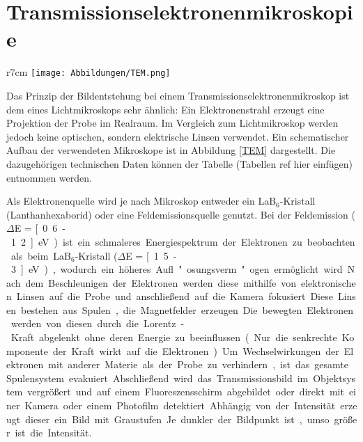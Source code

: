 \section{Transmissionselektronenmikroskopie} %
\label{sec:elektron_spektroskopie}

\begin{wrapfigure}{r}{7cm}
	\centering
	\texttt{[image: Abbildungen/TEM.png]}
	\caption[Schematische Aufbau eines Transmissionselektronenmikroskop]{Schematische Aufbau eines Transmissionselektronenmikroskop. (Quelle Benutzerhandbuch, JEOL Ldt.)}
	\label{TEM}
\end{wrapfigure}

Das Prinzip der Bildentstehung bei einem Transmissionselektronenmikroskop ist dem eines Lichtmikroskops sehr ähnlich:
Ein Elektronenstrahl erzeugt eine Projektion der Probe im Realraum.
Im Vergleich zum Lichtmikroskop werden jedoch keine optischen, sondern elektrische Linsen verwendet.
Ein schematischer Aufbau der verwendeten Mikroskope ist in Abbildung \ref{TEM} dargestellt.
Die dazugehörigen technischen Daten können der Tabelle (Tabellen ref hier einfügen) entnommen werden.

Als Elektronenquelle wird je nach Mikroskop entweder ein LaB$_6$-Kris\-tall (Lanthanhexaborid) oder eine Feldemissionsquelle genutzt.
Bei der Feldemission ($\Delta$E = \unit[0.6-1.2]{eV}) ist ein schmaleres Energiespektrum der Elektronen zu beobachten als beim LaB$_6$-Kris\-tall ($\Delta$E = \unit[1.5-3]{eV}), wodurch ein höheres Aufl"osungsverm"ogen ermöglicht wird.
Nach dem Beschleunigen der Elektronen werden diese mithilfe von elektronischen Linsen auf die Probe und anschließend auf die Kamera fokusiert.
Diese Linsen bestehen aus Spulen, die Magnetfelder erzeugen.
Die bewegten Elektronen werden von diesen durch die Lorentz-Kraft abgelenkt ohne deren Energie zu beeinflussen (Nur die senkrechte Komponente der Kraft wirkt auf die Elektronen).
Um Wechselwirkungen der Elektronen mit anderer Materie als der Probe zu verhindern, ist das gesamte Spulensystem evakuiert.
Abschließend wird das Transmissionsbild im Objektsystem vergrößert und auf einem Fluoreszensschirm abgebildet oder direkt mit einer Kamera oder einem Photofilm detektiert.
Abhängig von der Intensität erzeugt dieser ein Bild mit Graustufen.
Je dunkler der Bildpunkt ist, umso größer ist die Intensität.

